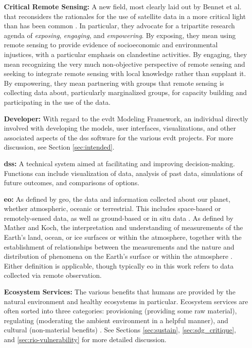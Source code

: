 \textbf{Critical Remote Sensing:} A new field, most clearly laid out by Bennet et al. that reconsiders the rationales for the use of satellite data in a more critical light than has been common \cite{bennettPoliticsPixelsReview2022}. In particular, they advocate for a tripartite research agenda of \textit{exposing}, \textit{engaging}, and \textit{empowering}. By exposing, they mean using remote sensing to provide evidence of socioeconomic and environmental injustices, with a particular emphasis on clandestine activities. By engaging, they mean recognizing the very much non-objective perspective of remote sensing and seeking to integrate remote sensing with local knowledge rather than supplant it. By empowering, they mean partnering with groups that remote sensing is collecting data about, particularly marginalized groups, for capacity building and participating in the use of the data.

\textbf{Developer:} With regard to the \ac{evdt} Modeling Framework, an individual directly involved with developing the models, user interfaces, visualizations, and other associated aspects of the \ac{dss} software for the various \ac{evdt} projects. For more discussion, see Section \ref{sec:intended}.

\textbf{\acf{dss}:} A technical system aimed at facilitating and improving decision-making. Functions can include visualization of data, analysis of past data, simulations of future outcomes, and comparisons of options.

\textbf{\acf{eo}:} As defined by \ac{geo}, the data and information collected about our planet, whether atmospheric, oceanic or terrestrial. This includes space-based or remotely-sensed data, as well as ground-based or in situ data \cite{grouponearthobservationsGEOGlance2019}. As defined by Mather and Koch, the interpretation and understanding of measurements of the Earth's land, ocean, or ice surfaces or within the atmosphere, together with the establishment of relationships between the measurements and the nature and distribution of phenomena on the Earth's surface or within the atmosphere \cite{matherComputerProcessingRemotelySensed2011}. Either definition is applicable, though typically \ac{eo} in this work refers to data collected via remote observation.

\textbf{Ecosystem Services:} The various benefits that humans are provided by the natural environment and healthy ecosystems in particular. Ecosystem services are often sorted into three categories: provisioning (providing some raw material), regulating (moderating the ambient environment in a helpful manner), and cultural (non-material benefits) \cite{haines-youngCommonInternationalClassification2018}. See Sections \ref{sec:sustain}, \ref{sec:sdg_critique}, and \ref{sec:rio-vulnerability} for more detailed discussion.

